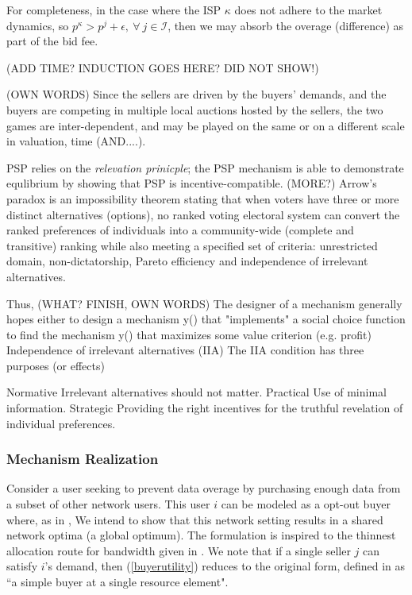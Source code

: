 \documentclass[12pt]{article}
\theoremstyle{definition}
\newcommand{\mcI}{\mathcal{I}}
\begin{document}
\begin{multicols}{2}
For completeness, in the case where the ISP $\kappa$ 
does not adhere to the market dynamics, so $p^\kappa > p^j +
\epsilon, \ \forall \ j \in\mcI$, then we may absorb the overage (difference) as part of the
bid fee.

(ADD TIME? INDUCTION GOES HERE? DID NOT SHOW!)

(OWN
WORDS) Since the sellers are driven by the buyers' demands, and the buyers are
competing in multiple local auctions hosted by the sellers, the two games are
inter-dependent, and may be played on the same or on a different scale in
valuation, time (AND....). 


PSP relies on the \emph{relevation prinicple}; the
PSP mechanism is able to demonstrate equlibrium by showing that PSP is
incentive-compatible. (MORE?)
Arrow's paradox is an impossibility theorem stating that when voters have three
or more distinct alternatives (options), no ranked voting electoral system can
convert the ranked preferences of individuals into a community-wide (complete
and transitive) ranking while also meeting a specified set of criteria:
unrestricted domain, non-dictatorship, Pareto efficiency and independence of
irrelevant alternatives.

Thus, (WHAT? FINISH, OWN WORDS)
The designer of a mechanism generally hopes either to design a mechanism
y() that "implements" a social choice function to find the
mechanism y() that maximizes some value criterion (e.g. profit)
Independence of irrelevant alternatives (IIA)
The IIA condition has three purposes (or effects)

Normative
Irrelevant alternatives should not matter.
Practical
Use of minimal information.
Strategic
Providing the right incentives for the truthful revelation of individual
preferences. 

\subsubsection{Mechanism Realization}\label{realization}

Consider a user seeking to prevent
data overage by purchasing enough data from a subset of other network users.
This user $i$ can be modeled as a opt-out buyer where, as in \cite{semret},
We intend to show that this network setting results in a shared network optima (a
global optimum). The formulation is inspired to the thinnest allocation route for
bandwidth given in \cite{lazar}. We note that if a single seller $j$ can
satisfy $i$'s demand, then
(\ref{buyerutility}) reduces to the original form, defined in
\cite{semret} as ``a simple buyer at a single resource element".


\end{multicols}
\end{document}
